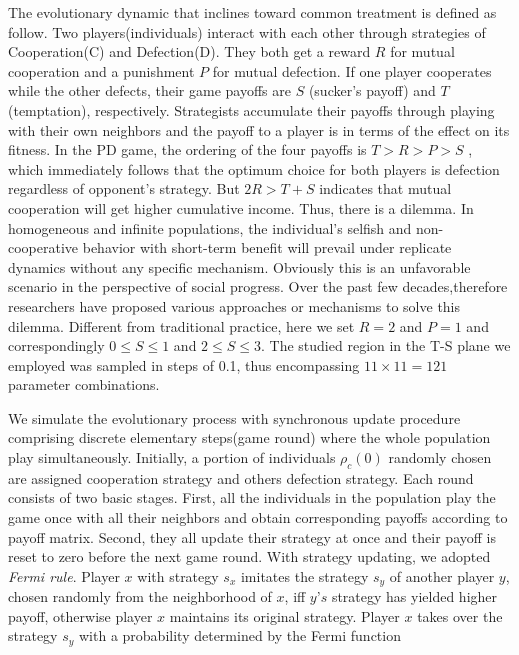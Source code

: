 \documentclass[preprint,12pt,3p]{elsarticle}
\begin{document}
\label{game model}
    The evolutionary dynamic that inclines toward common treatment is defined as follow.
Two players(individuals) interact with each other through strategies of Cooperation(C) and Defection(D).
They both get a reward $R$ for mutual cooperation and a punishment $P$ for mutual defection.
If one player cooperates while the other defects, their game payoffs are $S$
(sucker's payoff) and $T$ (temptation), respectively.
Strategists accumulate their payoffs through playing with their own neighbors and the payoff
to a player is in terms of the effect on its fitness.
In the PD game, the ordering of the four payoffs is $T > R > P > S$ , which immediately follows
that the optimum choice for both players is defection regardless of opponent's strategy.
But $2R > T+S$ indicates that mutual cooperation will get higher cumulative income.
Thus, there is a dilemma.
    In homogeneous and infinite populations, the individual's selfish and non-cooperative behavior
with short-term benefit will prevail under replicate dynamics  without any specific mechanism.
Obviously this is an unfavorable scenario in the perspective of social progress.
\label{sovle dilemma}Over the past few decades,therefore researchers have proposed various
approaches or mechanisms to solve this dilemma.
Different from traditional practice, here we set $R=2$ and $P=1$ and
correspondingly $0\leq S \leq1$ and $2\leq S \leq3$.
The studied region in the T-S plane we employed was sampled in steps of 0.1,
thus encompassing $11 \times 11=121$ parameter combinations.

    We simulate the evolutionary process with synchronous update procedure comprising
discrete elementary steps(game round) where the whole population play simultaneously.
Initially, a portion of individuals $\rho_{c}(0)$ randomly chosen are assigned cooperation strategy and others defection strategy.
Each round consists of two basic stages.
First, all the individuals in the population play the game once with all their neighbors and obtain
corresponding payoffs according to payoff matrix.
Second, they all update their strategy at once and their payoff is reset to zero before the next
game round.
With strategy updating, we adopted \textit{Fermi rule}\cite{SzabóTőke-18257}.
Player $x$ with strategy $s_x$ imitates the strategy $s_y$ of another player $y$,
chosen randomly from the neighborhood of $x$, iff $y’s$ strategy has yielded higher payoff,
otherwise player $x$ maintains its original strategy.
Player $x$ takes over the strategy $s_y$  with a probability determined by
the Fermi function
\end{document}
